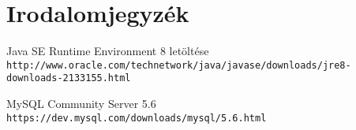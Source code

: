 \chapter{Irodalomjegyzék}

\begin{thebibliography}{9}
Java SE Runtime Environment 8 letöltése
\\\texttt{http://www.oracle.com/technetwork/java/javase/downloads/jre8-downloads-2133155.html}

MySQL Community Server 5.6
\\\texttt{https://dev.mysql.com/downloads/mysql/5.6.html}
\end{thebibliography}
